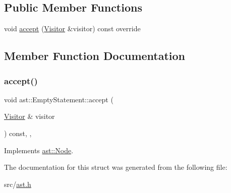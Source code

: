 \subsection*{Public Member Functions}
\begin{DoxyCompactItemize}
\item 
void \hyperlink{structast_1_1_empty_statement_a32aaa9a97be0d4b6862526a64b5ee6dd}{accept} (\hyperlink{structast_1_1_visitor}{Visitor} \&visitor) const override
\end{DoxyCompactItemize}


\subsection{Member Function Documentation}
\mbox{\label{structast_1_1_empty_statement_a32aaa9a97be0d4b6862526a64b5ee6dd}} 
\subsubsection{\texorpdfstring{accept()}{accept()}}
{\footnotesize\ttfamily void ast\+::\+Empty\+Statement\+::accept (\begin{DoxyParamCaption}\item[{\hyperlink{structast_1_1_visitor}{Visitor} \&}]{visitor }\end{DoxyParamCaption}) const\hspace{0.3cm}{\ttfamily [inline]}, {\ttfamily [override]}, {\ttfamily [virtual]}}



Implements \hyperlink{structast_1_1_node_abc089ee6caaf06a4445ebdd8391fdebc}{ast\+::\+Node}.



The documentation for this struct was generated from the following file\+:\begin{DoxyCompactItemize}
\item 
src/\hyperlink{ast_8h}{ast.\+h}\end{DoxyCompactItemize}

